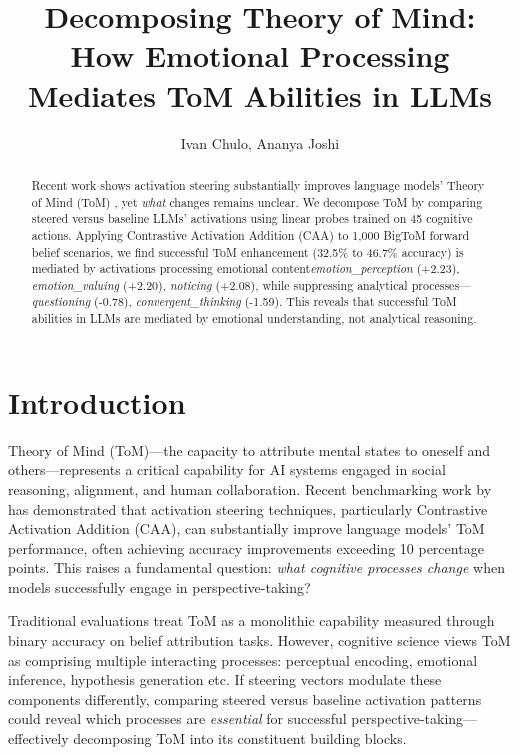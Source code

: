 \documentclass[letterpaper]{article}
\title{Decomposing Theory of Mind: How Emotional Processing Mediates ToM Abilities in LLMs}
\author{
    Ivan Chulo, Ananya Joshi
}
\begin{document}
\maketitle

\begin{abstract}
Recent work shows activation steering substantially improves language models' Theory of Mind (ToM) \cite{Bortoletto2024}, yet \textit{what} changes remains unclear. We decompose ToM by comparing steered versus baseline LLMs' activations using linear probes trained on 45 cognitive actions. Applying Contrastive Activation Addition (CAA) to 1,000 BigToM forward belief scenarios, we find successful ToM enhancement (32.5\% to 46.7\% accuracy) is mediated by activations processing emotional content\textit{emotion\_perception} (+2.23), \textit{emotion\_valuing} (+2.20), \textit{noticing} (+2.08), while suppressing analytical processes—\textit{questioning} (-0.78), \textit{convergent\_thinking} (-1.59). This reveals that successful ToM abilities in LLMs are mediated by emotional understanding, not analytical reasoning.
\end{abstract}

\section{Introduction}

Theory of Mind (ToM)—the capacity to attribute mental states to oneself and others—represents a critical capability for AI systems engaged in social reasoning, alignment, and human collaboration. Recent benchmarking work by \citet{Bortoletto2024} has demonstrated that activation steering techniques, particularly Contrastive Activation Addition (CAA), can substantially improve language models' ToM performance, often achieving accuracy improvements exceeding 10 percentage points. This raises a fundamental question: \textit{what cognitive processes change} when models successfully engage in perspective-taking?

Traditional evaluations treat ToM as a monolithic capability measured through binary accuracy on belief attribution tasks. However, cognitive science views ToM as comprising multiple interacting processes: perceptual encoding, emotional inference, hypothesis generation etc. If steering vectors modulate these components differently, comparing steered versus baseline activation patterns could reveal which processes are \textit{essential} for successful perspective-taking—effectively decomposing ToM into its constituent building blocks.
\end{document}
